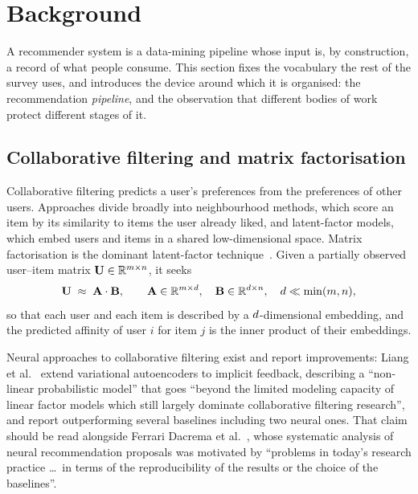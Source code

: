 \section{Background}
\label{sec:background}

A recommender system is a data-mining pipeline whose input is, by construction, a record of what
people consume. This section fixes the vocabulary the rest of the survey uses, and introduces the
device around which it is organised: the recommendation \emph{pipeline}, and the observation that
different bodies of work protect different stages of it.

\subsection{Collaborative filtering and matrix factorisation}
\label{sec:background:cf}

Collaborative filtering predicts a user's preferences from the preferences of other users.
Approaches divide broadly into neighbourhood methods, which score an item by its similarity to
items the user already liked, and latent-factor models, which embed users and items in a shared
low-dimensional space. Matrix factorisation is the dominant latent-factor
technique~\cite{koren2009,hu2008}. Given a partially observed user--item matrix
$\mathbf{U} \in \mathbb{R}^{m \times n}$, it seeks
%
\[
  \mathbf{U} \;\approx\; \mathbf{A} \cdot \mathbf{B},
  \qquad
  \mathbf{A} \in \mathbb{R}^{m \times d},
  \quad
  \mathbf{B} \in \mathbb{R}^{d \times n},
  \quad
  d \ll \min(m, n),
\]
%
so that each user and each item is described by a $d$-dimensional embedding, and the predicted
affinity of user $i$ for item $j$ is the inner product of their embeddings.

Neural approaches to collaborative filtering exist and report improvements: Liang et
al.~\cite{liang2018} extend variational autoencoders to implicit feedback, describing a
``non-linear probabilistic model'' that goes ``beyond the limited modeling capacity of linear
factor models which still largely dominate collaborative filtering research'', and report
outperforming several baselines including two neural ones. That claim should be read alongside
Ferrari Dacrema et al.~\cite{dacrema2019}, whose systematic analysis of neural recommendation
proposals was motivated by ``problems in today's research practice \dots\ in terms of the
reproducibility of the results or the choice of the baselines''.

